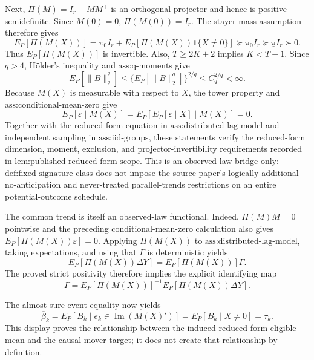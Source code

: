 Next, \(\Pi(M)=I_r-MM^+\) is an orthogonal projector and hence is positive semidefinite. Since \(M(0)=0\), \(\Pi(M(0))=I_r\). The stayer-mass assumption therefore gives
\[
E_P[\Pi(M(X))]
=\pi_0I_r+E_P[\Pi(M(X))\mathbf 1\{X\ne0\}]
\succeq\pi_0I_r
\succeq\underline\pi I_r
\succ0.
\]
Thus \(E_P[\Pi(M(X))]\) is invertible. Also, \(T\ge2K+2\) implies \(K<T-1\). Since \(q>4\), H\"older's inequality and \(\text{ass:q-moments}\) give
\[
E_P[\lVert B\rVert_2^2]
\le \{E_P[\lVert B\rVert_2^q]\}^{2/q}
\le C_q^{2/q}<\infty.
\]
Because \(M(X)\) is measurable with respect to \(X\), the tower property and \(\text{ass:conditional-mean-zero}\) give
\[
E_P[\varepsilon\mid M(X)]
=E_P\!\left[E_P[\varepsilon\mid X]\mid M(X)\right]=0.
\]
Together with the reduced-form equation in \(\text{ass:distributed-lag-model}\) and independent sampling in \(\text{ass:iid-groups}\), these statements verify the reduced-form dimension, moment, exclusion, and projector-invertibility requirements recorded in \(\text{lem:published-reduced-form-scope}\). This is an observed-law bridge only: \(\text{def:fixed-signature-class}\) does not impose the source paper's logically additional no-anticipation and never-treated parallel-trends restrictions on an entire potential-outcome schedule.

The common trend is itself an observed-law functional. Indeed, \(\Pi(M)M=0\) pointwise and the preceding conditional-mean-zero calculation also gives \(E_P[\Pi(M(X))\varepsilon]=0\). Applying \(\Pi(M(X))\) to \(\text{ass:distributed-lag-model}\), taking expectations, and using that \(\Gamma\) is deterministic yields
\[
E_P[\Pi(M(X))\Delta Y]
=E_P[\Pi(M(X))]\Gamma.
\]
The proved strict positivity therefore implies the explicit identifying map
\[
\Gamma
=E_P[\Pi(M(X))]^{-1}E_P[\Pi(M(X))\Delta Y].
\]

The almost-sure event equality now yields
\[
\overline\beta_k
=E_P[B_k\mid e_k\in\operatorname{Im}(M(X)')]
=E_P[B_k\mid X\ne0]
=\tau_k.
\]
This display proves the relationship between the induced reduced-form eligible mean and the causal mover target; it does not create that relationship by definition.

